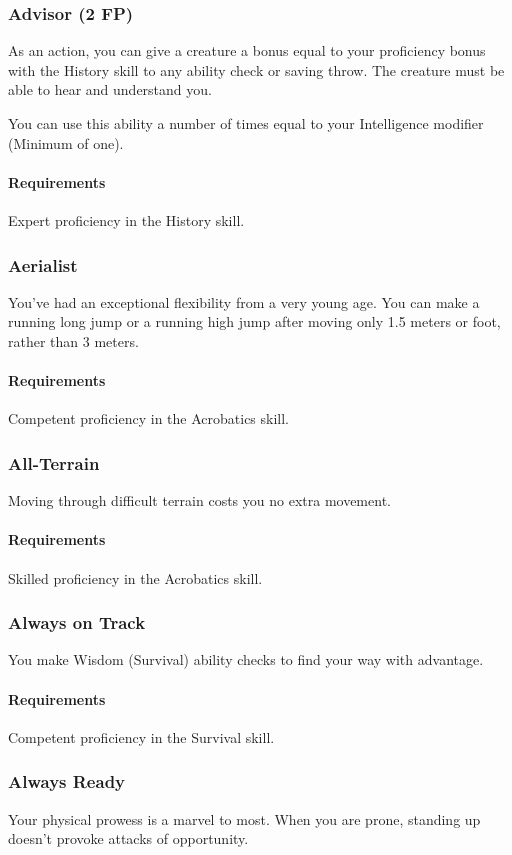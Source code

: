 \subsubsection{Advisor (2 FP)} \label{feat::advisor}
    As an action, you can give a creature a bonus equal to your proficiency bonus with the History skill to any ability check or saving throw.
    The creature must be able to hear and understand you.

    You can use this ability a number of times equal to your Intelligence modifier (Minimum of one).
    \paragraph{Requirements} Expert proficiency in the History skill.
\subsubsection{Aerialist} \label{feat::aerialist}
    You've had an exceptional flexibility from a very young age.
    You can make a running long jump or a running high jump after moving only 1.5 meters or foot, rather than 3 meters.
    \paragraph{Requirements} Competent proficiency in the Acrobatics skill.
\subsubsection{All-Terrain} \label{feat::allterrain}
    Moving through difficult terrain costs you no extra movement.
    \paragraph{Requirements} Skilled proficiency in the Acrobatics skill.
\subsubsection{Always on Track} \label{feat::alwaysontrack}
    You make Wisdom (Survival) ability checks to find your way with advantage.
    \paragraph{Requirements} Competent proficiency in the Survival skill.
\subsubsection{Always Ready} \label{feat::alwaysready}
    Your physical prowess is a marvel to most.
    When you are prone, standing up doesn't provoke attacks of opportunity.
